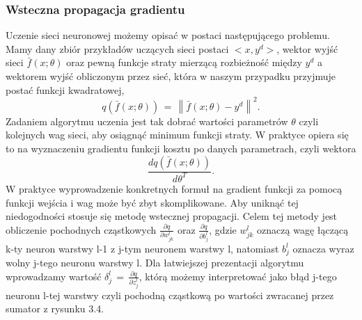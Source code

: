 \subsubsection{Wsteczna propagacja gradientu}
Uczenie sieci neuronowej możemy opisać w postaci następującego problemu. Mamy dany zbiór przykładów uczących sieci postaci \(<x,y^d> \), wektor wyjść sieci \(\bar{f}(x;\theta)\) oraz pewną funkcje straty mierzącą rozbieżność między \(y^d \) a wektorem wyjść obliczonym przez sieć, która w naszym przypadku przyjmuje postać funkcji kwadratowej, 
\begin{equation}
q(\bar{f}(x;\theta)) \, = \, \left\| \bar{f}(x;\theta) - y^d \right\|^2. 
\end{equation}
Zadaniem algorytmu uczenia jest tak dobrać wartości parametrów \( \theta \) czyli kolejnych wag sieci, aby osiągnąć minimum funkcji straty. W praktyce opiera się to na wyznaczeniu gradientu funkcji kosztu po danych parametrach, czyli wektora
\begin{equation}
\frac{dq(\bar{f}(x;\theta))}{d\theta^T}. 
\end{equation}
W praktyce wyprowadzenie konkretnych formuł na gradient funkcji za pomocą funkcji wejścia i wag może być zbyt skomplikowane. Aby uniknąć tej niedogodności stosuje się metodę wstecznej propagacji. Celem tej metody jest obliczenie pochodnych cząstkowych \( \frac{\partial q}{\partial w_{jk}^l} \) oraz \( \frac{\partial q}{\partial b_j^l} \), gdzie \( w_{jk}^l \) oznaczą wagę łączącą k-ty neuron warstwy l-1 z j-tym neuronem warstwy l, natomiast \(b_{j}^l\) oznacza wyraz wolny j-tego neuronu warstwy l. Dla łatwiejszej prezentacji algorytmu wprowadzamy wartość \( \delta_j^l \, = \, \frac{\partial q}{\partial z_j^l} \), którą możemy interpretować jako błąd j-tego neuronu l-tej warstwy czyli pochodną cząstkową po wartości zwracanej przez sumator z rysunku 3.4. 

